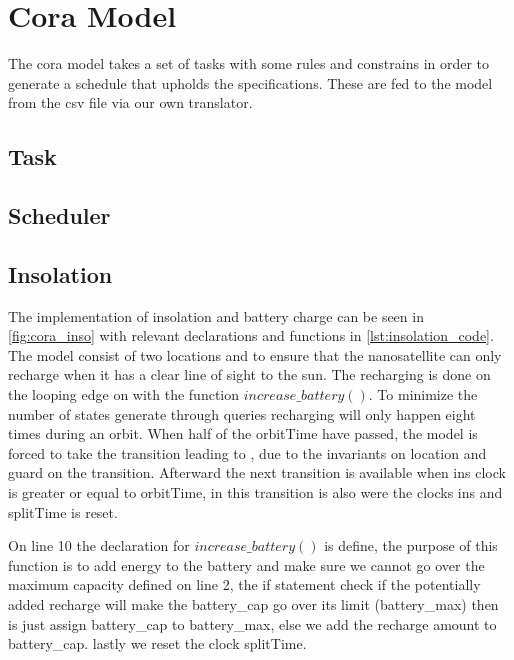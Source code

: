 \section{Cora Model} \label{sec:cora}
The \gls{cora} model takes a set of tasks with some rules and constrains in order to generate a schedule that upholds the specifications. These are fed to the model from the csv file via our own translator.


\subsection*{Task}
\subsection*{Scheduler}
\subsection*{Insolation}
The implementation of insolation and battery charge can be seen in \cref{fig:cora_inso} with relevant declarations and functions in \cref{lst:insolation_code}. The model consist of two locations  and  to ensure that the nanosatellite can only recharge when it has a clear line of sight to the sun. The recharging is done on the looping edge on  with the function $increase\_battery()$. To minimize the number of states generate through queries recharging will only happen eight times during an orbit. When half of the orbitTime have passed, the model is forced to take the transition leading to , due to the invariants on  location and guard on the transition. Afterward the next transition is available when ins clock is greater or equal to orbitTime, in this transition is also were the clocks ins and splitTime is reset.

On line 10 the declaration for $increase\_battery()$ is define, the purpose of this function is to add energy to the battery and make sure we cannot go over the maximum capacity defined on line 2, the if statement check if the potentially added recharge will make the battery\_cap go over its limit (battery\_max) then is just assign battery\_cap to battery\_max, else we add the recharge amount to battery\_cap. lastly we reset the clock splitTime.


